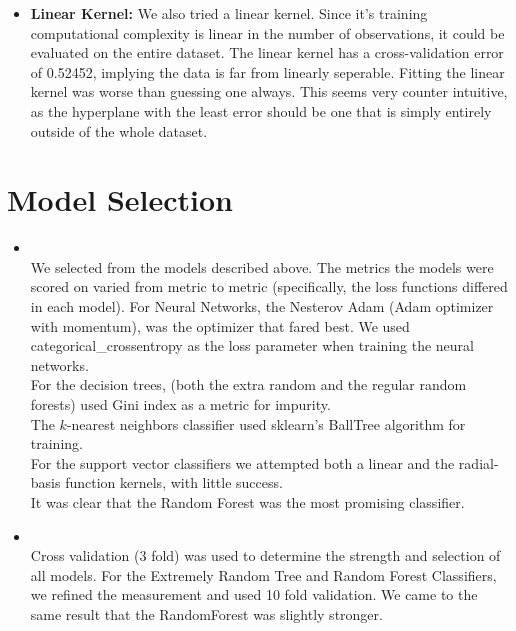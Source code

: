 \begin{itemize}
\begin{itemize}
\begin{itemize}
            \item \textbf{Linear Kernel:}
            We also tried a linear kernel. Since it's training computational
            complexity is linear in the number of observations, it could be
            evaluated on the entire dataset. The linear kernel has a
            cross-validation error of 0.52452, implying the data is far from
            linearly seperable.
            Fitting the linear kernel was worse than guessing one always. This
            seems very counter intuitive, as the hyperplane with the least
            error should be one that is simply entirely outside of the whole
            dataset.
        \end{itemize}
    \end{itemize}

\end{itemize}



\section{Model Selection}
\medskip
\begin{itemize}

    \item {} \\
    We selected from the models described above. The metrics the models were
    scored on varied from metric to metric (specifically, the loss functions
    differed in each model). For Neural Networks, the Nesterov Adam (Adam
    optimizer with momentum), was the optimizer that fared best. We used
    categorical_crossentropy as the loss parameter when training the
    neural networks.\\

    For the decision trees, (both the extra random and the
    regular random forests) used Gini index as a metric for impurity. \\

    The $k$-nearest neighbors classifier used sklearn's BallTree algorithm
    for training.\\

    For the support vector classifiers we attempted both a linear and the
    radial-basis function kernels, with little success. \\

    It was clear that the Random Forest was the most promising classifier.

\pagebreak

    \item {} \\
    Cross validation (3 fold) was used to determine the strength and selection
    of all models. For the Extremely Random Tree and Random Forest Classifiers,
    we refined the measurement and used 10 fold validation. We came to the
    same result that the RandomForest was slightly stronger.

\end{itemize}




